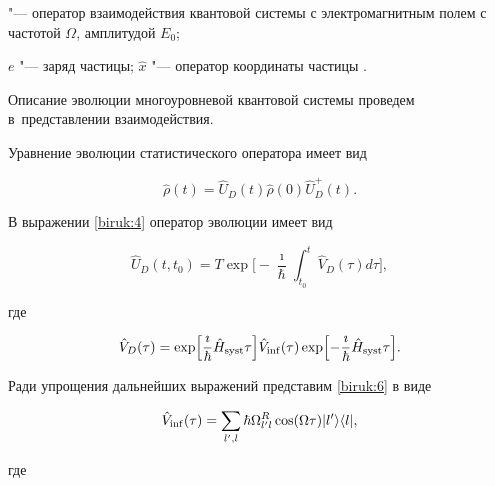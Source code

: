 "--- оператор взаимодействия квантовой системы с электромагнитным полем с частотой $\Omega$, амплитудой $E_{0}$; 

$e$ "--- заряд частицы; $\hat{x}$ "--- оператор координаты частицы \cite{biruk:Skalli}.

   

Описание эволюции многоуровневой квантовой системы проведем в~представлении взаимодействия.

Уравнение эволюции статистического оператора имеет вид

\begin{equation}

\hat{\rho}(t)=\hat{U}_D(t)\hat{\rho}(0)\hat{U}_D^+(t).

\label{biruk:4}

\end{equation}





В выражении \eqref{biruk:4} оператор эволюции имеет вид

\begin{equation}

\hat{U}_D(t,t_0)=T\exp\biggl[-\frac{\imath}{\hbar}\int_{t_0}^t \hat{V}_D(\tau) d\tau\biggr], 

\label{biruk:5}

\end{equation}

где

\begin{equation}

\hat{V}_D(\tau)=\exp\Bigl[\frac{\imath}{\hbar} \hat{H}_{\rm syst}\tau\Bigr] \hat{V}_{\rm inf}(\tau) \exp\Bigl[-\frac{\imath}{\hbar} \hat{H}_{\rm syst}\tau\Bigr]. 

\label{biruk:6}

\end{equation}





Ради упрощения дальнейших выражений представим \eqref{biruk:6} в виде

\begin{equation}

\hat{V}_{\rm inf}(\tau)=\sum\limits_{l',l}  \hbar \Omega_{l'l}^R \cos(\Omega \tau) |l'\rangle \langle l|,

\label{biruk:7}

\end{equation}

где

